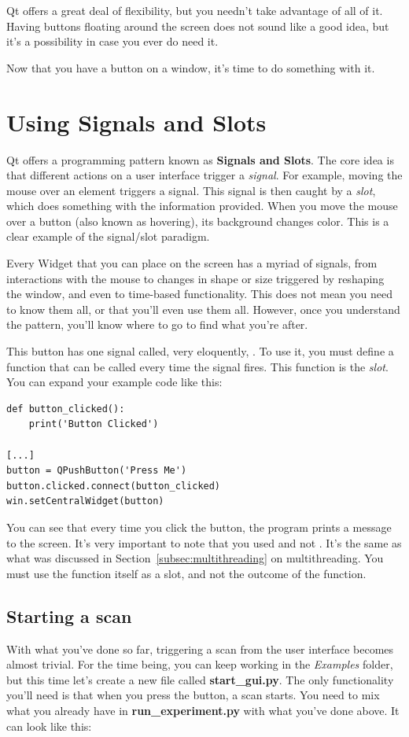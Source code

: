 Qt offers a great deal of flexibility, but you needn't take advantage of all of it. Having buttons floating around the screen does not sound like a good idea, but it's a possibility in case you ever do need it.

Now that you have a button on a window, it's time to do something with it.

\section{Using Signals and Slots}\label{sec:signals-slots}
Qt offers a programming pattern known as \textbf{Signals and Slots}. The core idea is that different actions on a user interface trigger a \emph{signal}. For example, moving the mouse over an element triggers a signal. This signal is then caught by a \emph{slot}, which does something with the information provided. When you move the mouse over a button (also known as hovering), its background changes color. This is a clear example of the signal/slot paradigm.

Every Widget that you can place on the screen has a myriad of signals, from interactions with the mouse to changes in shape or size triggered by reshaping the window, and even to time-based functionality. This does not mean you need to know them all, or that you'll even use them all. However, once you understand the pattern, you'll know where to go to find what you're after.

This button has one signal called, very eloquently, . To use it, you must define a function that can be called every time the signal fires. This function is the \emph{slot}. You can expand your example code like this:

\begin{verbatim}
def button_clicked():
    print('Button Clicked')

[...]
button = QPushButton('Press Me')
button.clicked.connect(button_clicked)
win.setCentralWidget(button)
\end{verbatim}

You can see that every time you click the button, the program prints a message to the screen. It's very important to note that you used  and not . It's the same as what was discussed in Section~\ref{subsec:multithreading} on multithreading. You must use the function itself as a slot, and not the outcome of the function.

\subsection{Starting a scan}\label{subsec:start-scan-gui}
With what you've done so far, triggering a scan from the user interface becomes almost trivial. For the time being, you can keep working in the \emph{Examples} folder, but this time let's create a new file called \textbf{start\_gui.py}. The only functionality you'll need is that when you press the button, a scan starts. You need to mix what you already have in \textbf{run\_experiment.py} with what you've done above. It can look like this:

